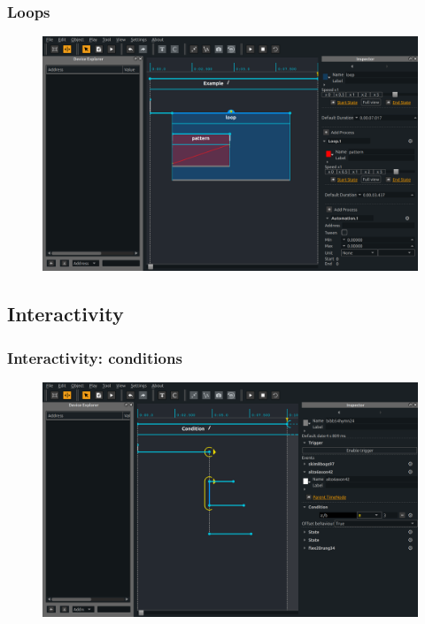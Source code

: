 \documentclass[handout]{beamer}
\begin{document}
\begin{frame}
\frametitle{Loops}
\Large
\begin{figure}
    \includegraphics[width=\textwidth]{images/loop.png}
\end{figure}
\end{frame}

\subsection{Interactivity}
\begin{frame}
\frametitle{Interactivity: conditions}
\Large
\begin{figure}
    \includegraphics[width=\textwidth]{images/conditions.png}
\end{figure}
\end{frame}
\end{document}
